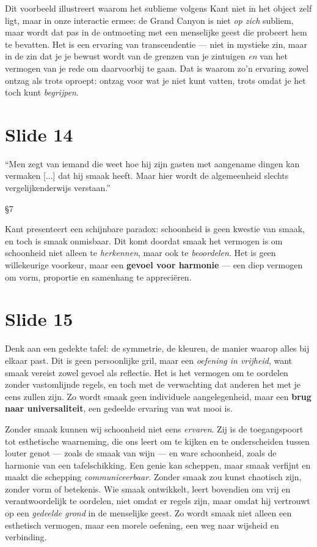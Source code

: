 \documentclass{article}
\begin{document}
Dit voorbeeld illustreert waarom het sublieme volgens Kant niet in het object zelf ligt, maar in onze interactie ermee: de Grand Canyon is niet \textit{op zich} subliem, maar wordt dat pas in de ontmoeting met een menselijke geest die probeert hem te bevatten. Het is een ervaring van transcendentie — niet in mystieke zin, maar in de zin dat je je bewust wordt van de grenzen van je zintuigen \textit{en} van het vermogen van je rede om daarvoorbij te gaan. Dat is waarom zo’n ervaring zowel ontzag als trots oproept: ontzag voor wat je niet kunt vatten, trots omdat je het toch kunt \textit{begrijpen}.

\section*{Slide 14}

\epigraph{``Men zegt van iemand die weet hoe hij zijn gasten met aangename dingen kan vermaken [...] dat hij smaak heeft. Maar hier wordt de algemeenheid slechts vergelijkenderwijs verstaan.''}{§7}

Kant presenteert een schijnbare paradox: schoonheid is geen kwestie van smaak, en toch is smaak onmisbaar. Dit komt doordat smaak het vermogen is om schoonheid niet alleen te \textit{herkennen}, maar ook te \textit{beoordelen}. Het is geen willekeurige voorkeur, maar een \textbf{gevoel voor harmonie} — een diep vermogen om vorm, proportie en samenhang te appreciëren. 

\section*{Slide 15}

Denk aan een gedekte tafel: de symmetrie, de kleuren, de manier waarop alles bij elkaar past. Dit is geen persoonlijke gril, maar een \textit{oefening in vrijheid}, want smaak vereist zowel gevoel als reflectie. Het is het vermogen om te oordelen zonder vastomlijnde regels, en toch met de verwachting dat anderen het met je eens zullen zijn. Zo wordt smaak geen individuele aangelegenheid, maar een \textbf{brug naar universaliteit}, een gedeelde ervaring van wat mooi is.

Zonder smaak kunnen wij schoonheid niet eens \textit{ervaren}. Zij is de toegangspoort tot esthetische waarneming, die ons leert om te kijken en te onderscheiden tussen louter genot — zoals de smaak van wijn — en ware schoonheid, zoals de harmonie van een tafelschikking. Een genie kan scheppen, maar smaak verfijnt en maakt die schepping \textit{communiceerbaar}. Zonder smaak zou kunst chaotisch zijn, zonder vorm of betekenis. Wie smaak ontwikkelt, leert bovendien om vrij en verantwoordelijk te oordelen, niet omdat er regels zijn, maar omdat hij vertrouwt op een \textit{gedeelde grond} in de menselijke geest. Zo wordt smaak niet alleen een esthetisch vermogen, maar een morele oefening, een weg naar wijsheid en verbinding.
\end{document}

